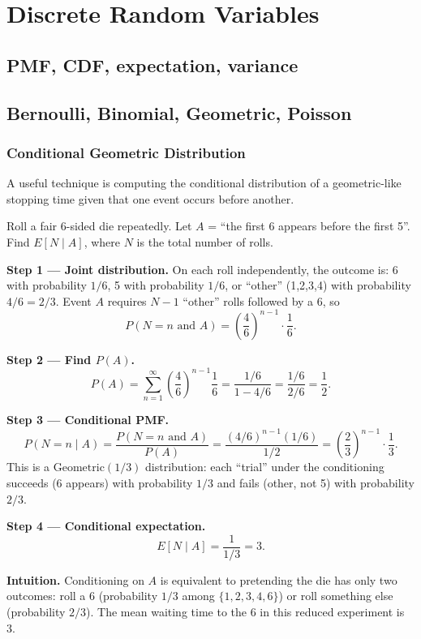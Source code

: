 
\section{Discrete Random Variables}

\subsection{PMF, CDF, expectation, variance}


\subsection{Bernoulli, Binomial, Geometric, Poisson}


\subsubsection*{Conditional Geometric Distribution}

A useful technique is computing the conditional distribution of a geometric-like stopping time given that one event occurs before another.

\begin{example}
Roll a fair 6-sided die repeatedly. Let $A$ = ``the first 6 appears before the first 5''. Find $E[N \mid A]$, where $N$ is the total number of rolls.

\textbf{Step 1 — Joint distribution.} On each roll independently, the outcome is: 6 with probability $1/6$, 5 with probability $1/6$, or ``other'' (1,2,3,4) with probability $4/6 = 2/3$. Event $A$ requires $N-1$ ``other'' rolls followed by a 6, so
\[
P(N = n \text{ and } A) = \left(\frac{4}{6}\right)^{n-1} \cdot \frac{1}{6}.
\]

\textbf{Step 2 — Find $P(A)$.}
\[
P(A) = \sum_{n=1}^{\infty} \left(\frac{4}{6}\right)^{n-1} \frac{1}{6}
= \frac{1/6}{1 - 4/6} = \frac{1/6}{2/6} = \frac{1}{2}.
\]

\textbf{Step 3 — Conditional PMF.}
\[
P(N = n \mid A) = \frac{P(N=n \text{ and } A)}{P(A)}
= \frac{(4/6)^{n-1}(1/6)}{1/2} = \left(\frac{2}{3}\right)^{n-1} \cdot \frac{1}{3}.
\]
This is a $\mathrm{Geometric}(1/3)$ distribution: each ``trial'' under the conditioning succeeds (6 appears) with probability $1/3$ and fails (other, not 5) with probability $2/3$.

\textbf{Step 4 — Conditional expectation.}
\[
E[N \mid A] = \frac{1}{1/3} = 3.
\]

\textbf{Intuition.} Conditioning on $A$ is equivalent to pretending the die has only two outcomes: roll a 6 (probability $1/3$ among $\{1,2,3,4,6\}$) or roll something else (probability $2/3$). The mean waiting time to the 6 in this reduced experiment is 3.
\end{example}

